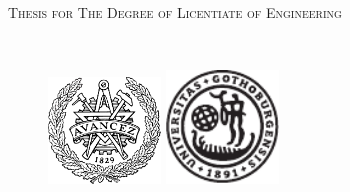 \ifx\phdThesis\undefined
\newcommand{\degreetitle}{Licentiate of Engineering}
\newcommand{\reportno}{TODO}
\newcommand{\Text}{%
ISSN 1652-876X\\ }
\else
\newcommand{\degreetitle}{Doctor of Philosophy}
\newcommand{\reportNoText}{ISBN \phdISBNNumber\\
Doktorsavhandlingar vid Chalmers tekniska h\"{o}gskola, Ny serie nr \phdSeriesNumber .\\
ISSN 0346-718X\\
\vspace{1cm}

\noindent
Technical Report No \techReportNumber \\
}
\fi



\thispagestyle{empty} %
\begin{center}
  \textsc{Thesis for The Degree of \degreetitle}\\
\end{center}

\vspace{6cm}
\begin{center} \Large \mytitle
\end{center}

\vspace{1cm}
\begin{center}
\textsc{\authorname} \\
\end{center}

\vspace{2cm}
\begin{figure}[h]
  \begin{center}
     \includegraphics[width=30mm]{Fig/Avancez50PC.pdf}
     \hspace{1cm}
     \includegraphics[width=30mm]{Fig/GU_nu.pdf}
  \end{center}
\end{figure}
\vspace{2cm}

